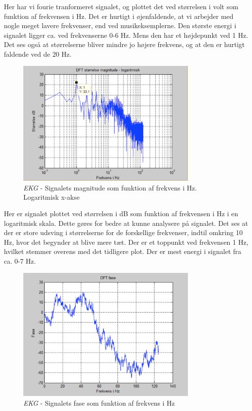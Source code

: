 Her har vi fourie tranformeret signalet, og plottet det ved størrelsen i volt som funktion af frekvensen i Hz. Det er hurtigt i øjenfaldende, at vi arbejder med nogle meget lavere frekvenser, end ved musikeksemplerne. Den største energi i signalet ligger ca. ved frekvenserne 0-6 Hz. Mens den har et højdepunkt ved 1 Hz. Det ses også at størrelserne bliver mindre jo højere frekvens, og at den er hurtigt faldende ved de 20 Hz. 

\begin{figure}[H]
	\centering
	\includegraphics[width=0.8\textwidth]{Figurer/EKG3}
	\caption{\textit{EKG} - Signalets magnitude som funktion af frekvens i Hz. Logaritmisk x-akse}
\end{figure}

Her er signalet plottet ved størrelsen i dB som funktion af frekvensen i Hz i en logaritmisk skala. Dette gøres for bedre at kunne analysere på signalet. Det ses at der er store udsving i størrelserne for de forskellige frekvenser, indtil omkring 10 Hz, hvor det begynder at blive mere tæt. Der er et toppunkt ved frekvensen 1 Hz, hvilket stemmer overens med det tidligere plot. Der er mest energi i signalet fra ca. 0-7 Hz.

\begin{figure}[H]
	\centering
	\includegraphics[width=0.8\textwidth]{Figurer/EKG4}
	\caption{\textit{EKG} - Signalets fase som funktion af frekvens i Hz}
\end{figure}

